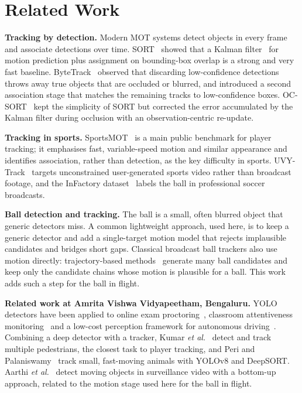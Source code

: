 \documentclass[conference]{IEEEtran}
\begin{document}
\section{Related Work}
\textbf{Tracking by detection.} Modern MOT systems detect objects in every frame
and associate detections over time. SORT~\cite{sort} showed that a Kalman
filter~\cite{kalman} for motion prediction plus assignment on bounding-box
overlap is a strong and very fast baseline. ByteTrack~\cite{bytetrack} observed
that discarding low-confidence detections throws away true objects that are
occluded or blurred, and introduced a second association stage that matches the
remaining tracks to low-confidence boxes. OC-SORT~\cite{ocsort} kept the
simplicity of SORT but corrected the error accumulated by the Kalman filter during
occlusion with an observation-centric re-update.

\textbf{Tracking in sports.} SportsMOT~\cite{sportsmot} is a main public benchmark
for player tracking; it emphasises fast, variable-speed motion and similar
appearance and identifies association, rather than detection, as the key
difficulty in sports. UVY-Track~\cite{uvy} targets unconstrained user-generated
sports video rather than broadcast footage, and the InFactory
dataset~\cite{infactory} labels the ball in professional soccer broadcasts.

\textbf{Ball detection and tracking.} The ball is a small, often blurred object that
generic detectors miss. A common lightweight approach, used here, is to keep a
generic detector and add a single-target motion model that rejects implausible
candidates and bridges short gaps. Classical broadcast ball trackers also use
motion directly: trajectory-based methods~\cite{yu2006} generate many ball
candidates and keep only the candidate chains whose motion is plausible for a
ball. This work adds such a step for the ball in flight.

\textbf{Related work at Amrita Vishwa Vidyapeetham, Bengaluru.} YOLO detectors
have been applied to online exam proctoring~\cite{singh2024proctor}, classroom
attentiveness monitoring~\cite{nair2023attentive} and a low-cost perception
framework for autonomous driving~\cite{gopikiran2025driving}. Combining a deep
detector with a tracker, Kumar \emph{et al.}~\cite{kumar2023pedestrian} detect and
track multiple pedestrians, the closest task to player tracking, and Peri and
Palaniswamy~\cite{peri2023animals} track small, fast-moving animals with YOLOv8 and
DeepSORT. Aarthi \emph{et al.}~\cite{aarthi2016moving} detect moving objects in
surveillance video with a bottom-up approach, related to the motion stage used
here for the ball in flight.
\end{document}
